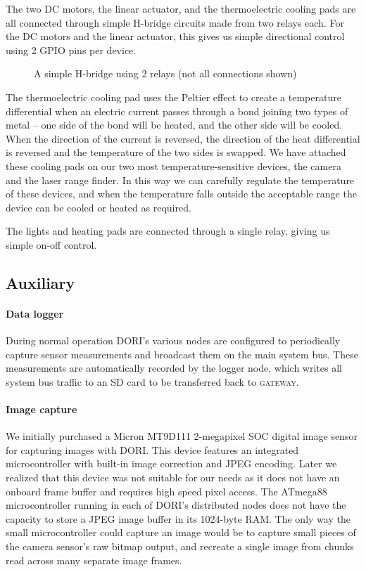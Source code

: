 \documentclass[12pt]{article}
\newcommand{\brand}{}
\begin{document}
    The two DC motors, the linear actuator, and the thermoelectric cooling pads are all connected through simple H-bridge circuits made from two relays each. For the DC motors and the linear actuator, this gives us simple directional control using 2 GPIO pins per device.

\begin{figure}[h]
    \centering
    
    \caption{A simple H-bridge using 2 relays (not all connections shown)}
\end{figure}

    
    The thermoelectric cooling pad uses the Peltier effect to create a temperature differential when an electric current passes through a bond joining two types of metal -- one side of the bond will be heated, and the other side will be cooled. When the direction of the current is reversed, the direction of the heat differential is reversed and the temperature of the two sides is swapped. We have attached these cooling pads on our two most temperature-sensitive devices, the camera and the laser range finder. In this way we can carefully regulate the temperature of these devices, and when the temperature falls outside the acceptable range the device can be cooled or heated as required.

    The lights and heating pads are connected through a single relay, giving us simple on-off control.

\subsection{Auxiliary}
    \paragraph*{Data logger}
    During normal operation DORI's various nodes are configured to periodically capture sensor measurements and broadcast them on the main system bus. These measurements are automatically recorded by the logger node, which writes all system bus traffic to an SD card to be transferred back to \textsc{gateway}.

    \paragraph*{Image capture}
    We initially purchased a \brand{Micron MT9D111} 2-megapixel SOC digital image sensor for capturing images with DORI. This device features an integrated microcontroller with built-in image correction and JPEG encoding. Later we realized that this device was not suitable for our needs as it does not have an onboard frame buffer and requires high speed pixel access. The ATmega88 microcontroller running in each of DORI's distributed nodes does not have the capacity to store a JPEG image buffer in its 1024-byte RAM. The only way the small microcontroller could capture an image would be to capture small pieces of the camera sensor's raw bitmap output, and recreate a single image from chunks read across many separate image frames.
\end{document}
